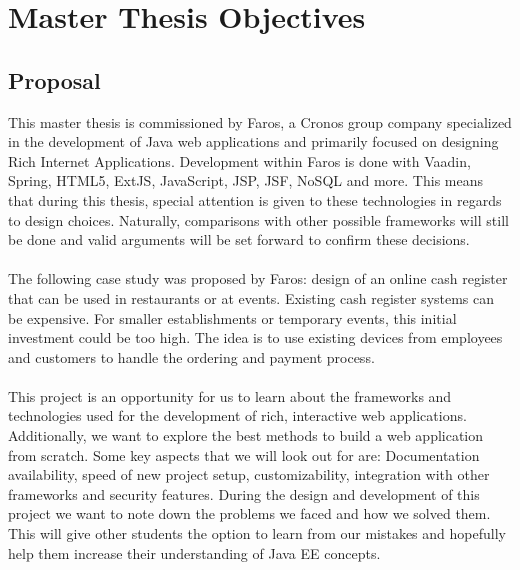 \documentclass[12pt]{article}
\begin{document}
\section{Master Thesis Objectives}
\begin{multicols}{2}
\subsection{Proposal}
This master thesis is commissioned by Faros, a Cronos group company specialized in the development of Java web applications and primarily focused on designing Rich Internet Applications. Development within Faros is done with Vaadin, Spring, HTML5, ExtJS, JavaScript, JSP, JSF, NoSQL and more.\cite{farosProposal} This means that during this thesis, special attention is given to these technologies in regards to design choices. Naturally, comparisons with other possible frameworks will still be done and valid arguments will be set forward to confirm these decisions.
\\\\
The following case study was proposed by Faros: design of an online cash register that can be used in restaurants or at events. Existing cash register systems can be expensive. For smaller establishments or temporary events, this initial investment could be too high. The idea is to use existing devices from employees and customers to handle the ordering and payment process.
\\\\
This project is an opportunity for us to learn about the frameworks and technologies used for the development of rich, interactive web applications. Additionally, we want to explore the best methods to  build a web application from scratch. Some key aspects that we will look out for are: Documentation availability, speed of new project setup, customizability, integration with other frameworks and security features. During the design and development of this project we want to note down the problems we faced and how we solved them. This will give other students the option to learn from our mistakes and hopefully help them increase their understanding of Java EE concepts. 


\end{multicols}
\end{document}
